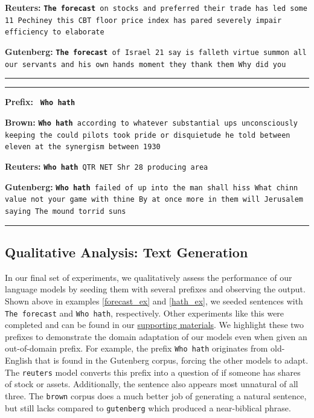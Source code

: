 \documentclass[11pt,a4paper]{article}
\begin{document}
\textbf{Reuters:}  \texttt{\textbf{The forecast} on stocks and preferred their trade has led some 11 Pechiney this CBT floor price index has pared severely impair efficiency to elaborate}
\vspace{1mm}

\textbf{Gutenberg:} \texttt{\textbf{The forecast} of Israel 21 say is falleth virtue summon all our servants and his own hands moment they thank them Why did you}

\rule{0.49\textwidth}{0.4pt}



\rule{0.49\textwidth}{0.4pt}
\label{hath_ex}
\textbf{Prefix:} \texttt{ \textbf{Who hath} }
\vspace{1mm}

\textbf{Brown:}  \texttt{\textbf{Who hath} according to whatever substantial ups unconsciously keeping the could pilots took pride or disquietude he told between eleven at the synergism between 1930}
\vspace{1mm}

\textbf{Reuters:}    \texttt{\textbf{Who hath} QTR NET Shr   28 producing area}
\vspace{1mm}

\textbf{Gutenberg:} \texttt{\textbf{Who hath} failed of up into the man shall hiss What chinn value not your game with thine By at once more in them will Jerusalem saying The mound torrid suns}

\rule{0.49\textwidth}{0.4pt}


\subsection{Qualitative Analysis: Text Generation}
\label{subsec:language_gen}

In our final set of experiments, we qualitatively assess the performance of our language models by seeding them with
several prefixes and observing the output. Shown above in examples \ref{forecast_ex} and \ref{hath_ex}, we seeded sentences with \texttt{The forecast} and \texttt{Who hath}, respectively. Other experiments like this were completed and can be found in our \href{https://github.com/SamShowalter/CS272-NLP/tree/master/hw2}{supporting materials}. We highlight these two prefixes to demonstrate the domain adaptation of our models even when given an out-of-domain prefix. For example, the prefix \texttt{Who hath} originates from old-English that is found in the Gutenberg corpus, forcing the other models to adapt. The \texttt{reuters} model converts this prefix into a question of if someone has shares of stock or assets. Additionally, the sentence also appears most unnatural of all three. The \texttt{brown} corpus does a much better job of generating a natural sentence, but still lacks compared to \texttt{gutenberg} which produced a near-biblical phrase. 
\end{document}
